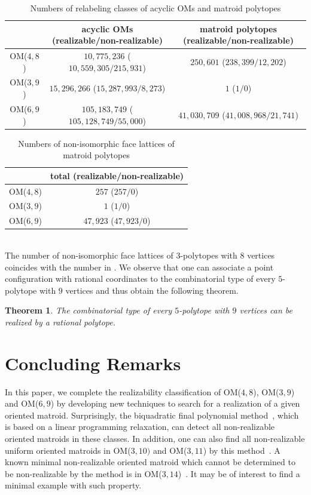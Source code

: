 \documentclass{article}
\newtheorem{thm}{Theorem}[section]
\begin{document}
\begin{table}[h]
\begin{center}
\begin{tabular}{| c | c | c | }
\hline
          & acyclic OMs (realizable/non-realizable) & matroid polytopes (realizable/non-realizable) \\
 \hline
OM($4,8$) & $10,775,236$ ($10,559,305/215,931$) & $250,601$ ($238,399/12,202$) \\ 
 \hline 
 OM($3,9$) & $15,296,266$ ($15,287,993/8,273$) & $1$ ($1/0$) \\
 \hline
 OM($6,9$) & $105,183,749$ ($105,128,749/55,000$) & $41,030,709$ ($41,008,968/21,741$) \\
 \hline
\end{tabular}
\end{center}
\caption{Numbers of relabeling classes of acyclic OMs and matroid polytopes}
\label{no_acyclic}
\end{table} 
\begin{table}[h]
\begin{center}
\begin{tabular}{| c | c |  }
\hline
          & total (realizable/non-realizable)\\
 \hline
OM($4,8$) & $257$ ($257/0$) \\
\hline
 OM($3,9$) & $1$ ($1/0$) \\
 \hline
 OM($6,9$) & $47,923$ ($47,923/0$) \\
 \hline
\end{tabular}
\end{center}
\caption{Numbers of non-isomorphic face lattices of matroid polytopes}
\label{no_face_lattices}
\end{table} 
\\
The number of non-isomorphic face lattices of $3$-polytopes with $8$ vertices coincides with the number in \cite[p.424, Table 2]{G03}.
We observe that one can associate a point configuration with rational coordinates
to the combinatorial type of every $5$-polytope with $9$ vertices and thus obtain the following theorem.
\begin{thm}
The combinatorial type of every $5$-polytope with $9$ vertices can be realized by a rational polytope.
\end{thm}

\section{Concluding Remarks}
In this paper, we complete the realizability classification of OM($4,8$), OM($3,9$) and OM($6,9$)
by developing new techniques to search for a realization of a given oriented matroid.
Surprisingly, the biquadratic final polynomial method~\cite{BR90}, which is based on a linear programming relaxation,
can detect all non-realizable oriented matroids in these classes.
In addition, one can also find all non-realizable uniform oriented matroids in OM($3,10)$ and OM($3,11$)
by this method~\cite{AAK02,AK06}.
A known minimal non-realizable oriented matroid which cannot be 
determined to be non-realizable by the method
is in OM($3,14$)~\cite{R96}.
It may be of interest to find a minimal example with such property.
\end{document}
